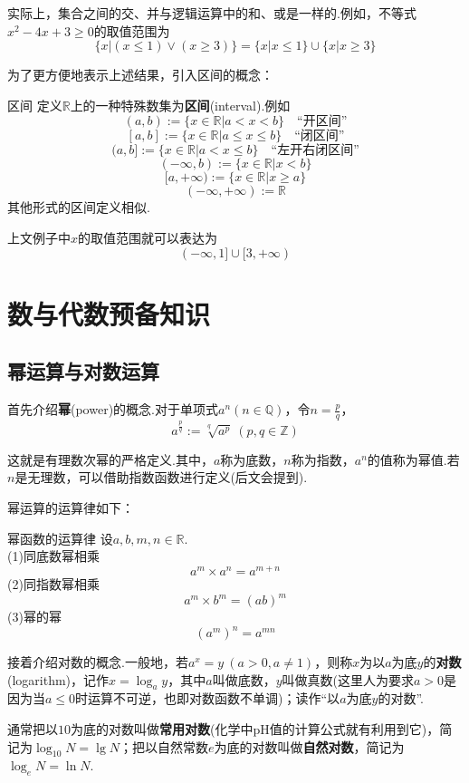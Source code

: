 \documentclass[lang=cn, zihao=5]{elegantbook}
\newcommand{\R}{\mathbb{R}}
\begin{document}
实际上，集合之间的交、并与逻辑运算中的和、或是一样的.例如，不等式$x^2-4x+3 \geq 0$的取值范围为$$\{ x|(x \leq 1) \vee (x \geq 3) \} = \{ x|x \leq 1 \} \cup \{ x|x \geq 3 \}$$

为了更方便地表示上述结果，引入区间的概念：

\begin{definition}{区间}
	定义$\R$上的一种特殊数集为\textbf{区间}(interval).例如 \\
	$$(a,b):=\{ x \in \R | a<x<b \} \quad \textit{“开区间”}$$
	$$[a,b]:=\{ x \in \R | a \leq x \leq b \} \quad \textit{“闭区间”}$$
	$$(a,b]:=\{ x \in \R | a<x \leq b \} \quad \textit{“左开右闭区间”}$$
	$$(-\infty,b):=\{ x \in \R | x<b \}$$
	$$[a,+\infty):=\{ x \in \R | x \geq a \}$$
	$$(-\infty ,+\infty):= \R $$
	其他形式的区间定义相似.
\end{definition}

上文例子中$x$的取值范围就可以表达为$$(-\infty ,1] \cup [3,+\infty )$$


\chapter{数与代数预备知识}

\section{幂运算与对数运算}

首先介绍\textbf{幂}(power)的概念.对于单项式$a^n(n \in \mathbb{Q})$，令$n=\frac{p}{q}$，
$$a^{\frac{p}{q}}:=\sqrt[q]{a^p} \ (p,q \in \mathbb{Z})$$

这就是有理数次幂的严格定义.其中，$a$称为底数，$n$称为指数，$a^n$的值称为幂值.若$n$是无理数，可以借助指数函数进行定义(后文会提到).

幂运算的运算律如下：

\begin{proposition}{幂函数的运算律}
	设$a,b,m,n \in \R $. \\
	(1)同底数幂相乘$$a^m \times a^n = a^{m+n}$$
	(2)同指数幂相乘$$a^m \times b^m = (ab)^m$$
	(3)幂的幂$$(a^m)^n=a^{mn}$$
\end{proposition}

接着介绍对数的概念.一般地，若$a^x=y~(a>0,a \neq 1)$，则称$x$为以$a$为底$y$的\textbf{对数}(logarithm)，记作$x = \log_{a}{y}$，其中$a$叫做底数，$y$叫做真数(这里人为要求$a>0$是因为当$a\leq 0$时运算不可逆，也即对数函数不单调)；读作“以$a$为底$y$的对数”.

通常把以$10$为底的对数叫做\textbf{常用对数}(化学中pH值的计算公式就有利用到它)，简记为$\log_{10}{N}=\lg N$；把以自然常数$e$为底的对数叫做\textbf{自然对数}，简记为$\log_{e}{N}=\ln N$.
\end{document}
